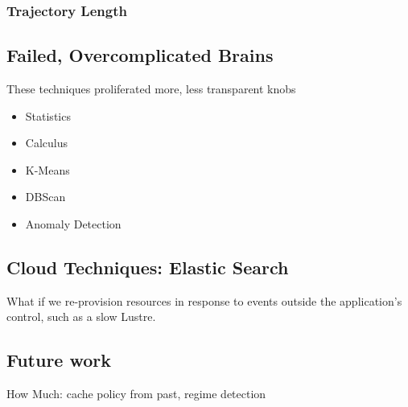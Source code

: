\subsubsection{Trajectory Length}

\subsection{Failed, Overcomplicated Brains}
These techniques proliferated more, less transparent knobs
\begin{itemize}
  \item Statistics
  \item Calculus
  \item K-Means
  \item DBScan
  \item Anomaly Detection
\end{itemize}


\subsection{Cloud Techniques: Elastic Search}

What if we re-provision resources in response to events outside the
application's control, such as a slow Lustre.

\subsection{Future work}

How Much: cache policy from past, regime detection
